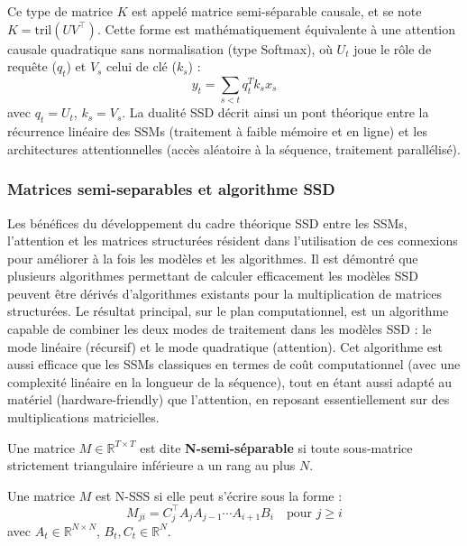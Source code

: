 Ce type de matrice $K$ est appelé matrice semi-séparable causale, et se note $K = \text{tril}(UV^\top)$. Cette forme est mathématiquement équivalente à une attention causale quadratique sans normalisation (type Softmax), où $U_t$ joue le r\^ole de requ\^ete ($q_t$) et $V_s$ celui de clé ($k_s$) :
\begin{equation}
    y_t = \sum_{s < t} q_t^T k_s x_s
\end{equation}
avec $q_t = U_t$, $k_s = V_s$. La dualité SSD décrit ainsi un pont théorique entre la récurrence linéaire des SSMs (traitement à faible mémoire et en ligne) et les architectures attentionnelles (accès aléatoire à la séquence, traitement parallélisé).

\subsubsection{Matrices semi-separables et algorithme SSD}

Les bénéfices du développement du cadre théorique SSD entre les SSMs, l’attention et les matrices structurées résident dans l’utilisation de ces connexions pour améliorer à la fois les modèles et les algorithmes. Il est démontré que plusieurs algorithmes permettant de calculer efficacement les modèles SSD peuvent être dérivés d’algorithmes existants pour la multiplication de matrices structurées. Le résultat principal, sur le plan computationnel, est un algorithme capable de combiner les deux modes de traitement dans les modèles SSD : le mode linéaire (récursif) et le mode quadratique (attention). Cet algorithme est aussi efficace que les SSMs classiques en termes de coût computationnel (avec une complexité linéaire en la longueur de la séquence), tout en étant aussi adapté au matériel (hardware-friendly) que l’attention, en reposant essentiellement sur des multiplications matricielles.\\

\begin{definition}
Une matrice $M \in \mathbb{R}^{T \times T}$ est dite \textbf{N-semi-séparable} si toute sous-matrice strictement triangulaire inférieure a un rang au plus $N$.
\end{definition}

\begin{theorem}
Une matrice $M$ est N-SSS si elle peut s’écrire sous la forme :
\begin{equation}
    M_{ji} = C_j^\top A_{j} A_{j-1} \cdots A_{i+1} B_i \quad \text{pour } j \geq i
\end{equation}
avec $A_t \in \mathbb{R}^{N \times N}$, $B_t, C_t \in \mathbb{R}^{N}$.
\end{theorem}

